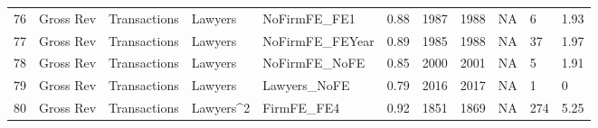 \begin{table}[ht]
\begin{tabular}{rllllllllll}
  76 & Gross Rev & Transactions & Lawyers & NoFirmFE\_FE1 & 0.88 & 1987 & 1988 & NA & 6 & 1.93 \\ 
  77 & Gross Rev & Transactions & Lawyers & NoFirmFE\_FEYear & 0.89 & 1985 & 1988 & NA & 37 & 1.97 \\ 
  78 & Gross Rev & Transactions & Lawyers & NoFirmFE\_NoFE & 0.85 & 2000 & 2001 & NA & 5 & 1.91 \\ 
  79 & Gross Rev & Transactions & Lawyers & Lawyers\_NoFE & 0.79 & 2016 & 2017 & NA & 1 & 0 \\ 
  80 & Gross Rev & Transactions & Lawyers^2 & FirmFE\_FE4 & 0.92 & 1851 & 1869 & NA & 274 & 5.25 \\ 
   \hline
\end{tabular}
\end{table}
